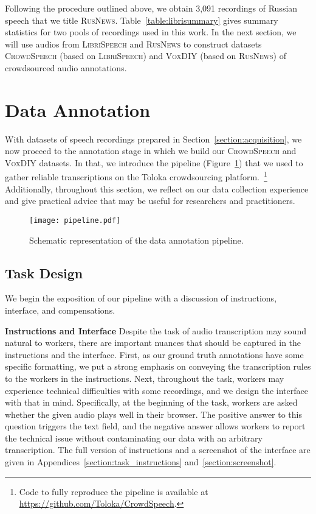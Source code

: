 \documentclass{article}
\newcommand{\libri}{\textsc{LibriSpeech}}
\newcommand{\speech}{\textsc{CrowdSpeech}}
\newcommand{\vox}{\textsc{VoxDIY}}
\newcommand{\news}{\textsc{RusNews}}
\begin{document}
Following the procedure outlined above, we obtain 3,091 recordings of Russian speech that we title \news{}. Table~\ref{table:librisummary} gives summary statistics for two pools of recordings used in this work. In the next section, we will use audios from \libri{} and \news{} to construct datasets \speech{} (based on \libri{}) and \vox{} (based on \news{}) of crowdsourced audio annotations.

\section{Data Annotation}
\label{section:annotation}

With datasets of speech recordings prepared in Section~\ref{section:acquisition}, we now proceed to the annotation stage in which we build our \speech{} and \vox{} datasets. In that, we introduce the pipeline (Figure~\ref{fig:pipeline}) that we used to gather reliable transcriptions on the Toloka crowdsourcing platform.~\footnote{Code to fully reproduce the pipeline is available at \url{https://github.com/Toloka/CrowdSpeech}.} Additionally, throughout this section, we reflect on our data collection experience and give practical advice that may be useful for researchers and practitioners. 
\begin{figure}[t]
  \centering
  \texttt{[image: pipeline.pdf]}
  \caption{\label{fig:pipeline}Schematic representation of the data annotation pipeline.}
\end{figure}

\subsection{Task Design}

We begin the exposition of our pipeline with a discussion of instructions, interface, and compensations.

\textbf{Instructions and Interface} 
Despite the task of audio transcription may sound natural to workers, there are important nuances that should be captured in the instructions and the interface. First, as our ground truth annotations have some specific formatting, we put a strong emphasis on conveying the transcription rules to the workers in the instructions. Next, throughout the task, workers may experience technical difficulties with some recordings, and we design the interface with that in mind. Specifically, at the beginning of the task, workers are asked whether the given audio plays well in their browser. The positive answer to this question  triggers the text field, and the negative answer allows workers to report the technical issue without contaminating our data with an arbitrary transcription. The full version of instructions and a screenshot of the interface are given in Appendices~\ref{section:task_instructions} and~\ref{section:screenshot}.
\end{document}
